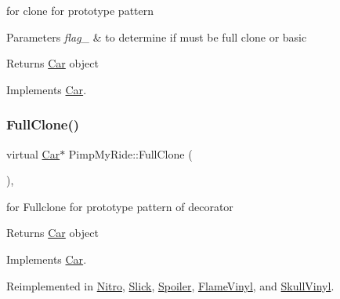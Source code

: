 for clone for prototype pattern 
\begin{DoxyParams}{Parameters}
{\em flag\+\_\+} & to determine if must be full clone or basic \\
\hline
\end{DoxyParams}
\begin{DoxyReturn}{Returns}
\mbox{\hyperlink{class_car}{Car}} object 
\end{DoxyReturn}


Implements \mbox{\hyperlink{class_car_a27ad98735fd4a3f675234ea806c227da}{Car}}.

\mbox{\label{class_pimp_my_ride_afce12a1a761727eebec707924521d0e2}} 
\subsubsection{\texorpdfstring{Full\+Clone()}{FullClone()}}
{\footnotesize\ttfamily virtual \mbox{\hyperlink{class_car}{Car}}$\ast$ Pimp\+My\+Ride\+::\+Full\+Clone (\begin{DoxyParamCaption}{ }\end{DoxyParamCaption})\hspace{0.3cm}{\ttfamily [inline]}, {\ttfamily [virtual]}}

for Fullclone for prototype pattern of decorator \begin{DoxyReturn}{Returns}
\mbox{\hyperlink{class_car}{Car}} object 
\end{DoxyReturn}


Implements \mbox{\hyperlink{class_car_a6e32b3e8ddaaf2b3873c849e42f6a085}{Car}}.



Reimplemented in \mbox{\hyperlink{class_nitro_a1574264a8ca8691bb3669c8a3a3ad5dd}{Nitro}}, \mbox{\hyperlink{class_slick_a09178f75aaba34e79992c66eac80974e}{Slick}}, \mbox{\hyperlink{class_spoiler_a240c57673fae69ffa9cf51468ca17793}{Spoiler}}, \mbox{\hyperlink{class_flame_vinyl_a10356b9fab01a74d2354773e0beaba8b}{Flame\+Vinyl}}, and \mbox{\hyperlink{class_skull_vinyl_a02a74e1366553be8263a5751239bb8bf}{Skull\+Vinyl}}.

\mbox{\label{class_pimp_my_ride_afd1a51b17959c3476d2ead62325d026e}} 
